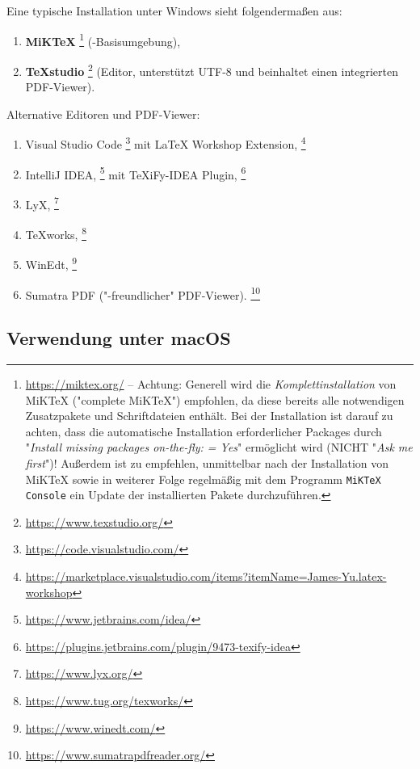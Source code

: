 Eine typische Installation unter Windows sieht folgendermaßen aus:
%
\begin{enumerate}
\item \textbf{MiKTeX}%
	\footnote{\url{https://miktex.org/} -- Achtung:
	Generell wird die \emph{Komplettinstallation} von MiKTeX ("complete
	MiKTeX") empfohlen, da diese bereits alle notwendigen Zusatzpakete und
	Schriftdateien enthält. Bei der Installation ist darauf zu achten,
	dass die automatische Installation erforderlicher Packages durch
	"\emph{Install missing packages on-the-fly: = Yes}" ermöglicht wird
	(NICHT "\emph{Ask me first}")! Außerdem ist zu empfehlen, unmittelbar
	nach der Installation von MiKTeX sowie in weiterer Folge regelmäßig
	mit dem Programm \texttt{MiKTeX Console} ein Update der installierten
	Pakete durchzuführen.} (\latex-Basisumgebung),
\item \textbf{TeXstudio}%
	\footnote{\url{https://www.texstudio.org/}}
	(Editor, unterstützt UTF-8 und beinhaltet einen integrierten PDF-Viewer).
\end{enumerate}
%
Alternative Editoren und PDF-Viewer:
%
\begin{enumerate}
	\item Visual Studio Code%
	\footnote{\url{https://code.visualstudio.com/}}
	mit LaTeX Workshop Extension,%
	\footnote{\url{https://marketplace.visualstudio.com/items?itemName=James-Yu.latex-workshop}}
	\item IntelliJ IDEA,%
	\footnote{\url{https://www.jetbrains.com/idea/}}
	mit TeXiFy-IDEA Plugin,%
	\footnote{\url{https://plugins.jetbrains.com/plugin/9473-texify-idea}}
	\item LyX,%
	\footnote{\url{https://www.lyx.org/}}
	\item TeXworks,%
	\footnote{\url{https://www.tug.org/texworks/}}
	\item WinEdt,%
	\footnote{\url{https://www.winedt.com/}}
	\item Sumatra PDF ("\latex-freundlicher" PDF-Viewer).%
	\footnote{\url{https://www.sumatrapdfreader.org/}}
\end{enumerate}

\subsection{Verwendung unter macOS}

